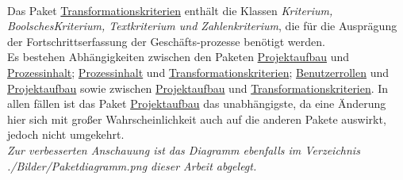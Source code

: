 \vspace{1em}
\\Das Paket \underline{Transformationskriterien} enthält die Klassen \emph{Kriterium, BoolschesKriterium, Textkriterium und Zahlenkriterium}, die für die Ausprägung der Fortschrittserfassung der Geschäfts-prozesse benötigt werden.
\vspace{1em}
\\Es bestehen Abhängigkeiten zwischen den Paketen \underline{Projektaufbau} und \underline{Prozessinhalt}; \underline{Prozessinhalt} und \underline{Transformationskriterien}; \underline{Benutzerrollen} und \underline{Projektaufbau} sowie zwischen \underline{Projektaufbau} und \underline{Transformationskriterien}. In allen fällen ist das Paket \underline{Projektaufbau} das unabhängigste, da eine Änderung hier sich mit großer Wahrscheinlichkeit auch auf die anderen Pakete auswirkt, jedoch nicht umgekehrt.
\vspace{1em}
\\\emph{Zur verbesserten Anschauung ist das Diagramm ebenfalls im Verzeichnis ./Bilder/Paketdiagramm.png dieser Arbeit abgelegt.}
